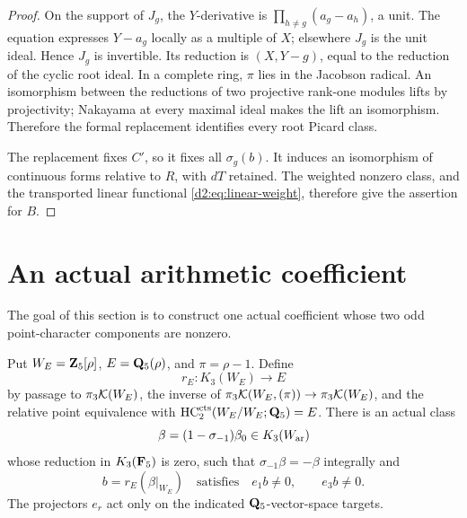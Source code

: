 \begin{proof}
On the support of \(J_g\), the \(Y\)-derivative is
\(\prod_{h\ne g}(a_g-a_h)\), a unit.
The equation expresses \(Y-a_g\) locally as a multiple of \(X\);
elsewhere \(J_g\) is the unit ideal.
Hence \(J_g\) is invertible.
Its reduction is \((X,Y-g)\), equal to the reduction of the cyclic
root ideal.
In a complete ring, \(\pi\) lies in the Jacobson radical.
An isomorphism between the reductions of two projective rank-one
modules lifts by projectivity; Nakayama at every maximal ideal
makes the lift an isomorphism.
Therefore the formal replacement identifies every root Picard class.

The replacement fixes \(C'\), so it fixes all \(\sigma_g(b)\).
It induces an isomorphism of continuous forms relative to \(R\),
with \(dT\) retained.
The weighted nonzero class, and the transported linear functional
\eqref{d2:eq:linear-weight}, therefore give the assertion for \(B\).
\end{proof}

\section{An actual arithmetic coefficient}\label{d2:sec:arithmetic}

The goal of this section is to construct one actual coefficient whose
two odd point-character components are nonzero.

\begin{proposition}\label{d2:prop:coefficient}
Put \(W_E=\mathbf{Z}_5[\rho]\), \(E=\mathbf{Q}_5(\rho)\), and
\(\pi=\rho-1\).
Define
\[
 r_E\colon K_3(W_E)\longrightarrow E
\]
by passage to \(\pi_3\mathcal K(W_E)\), the inverse of
\(\pi_3\mathcal K(W_E,(\pi))\to\pi_3\mathcal K(W_E)\), and the relative point
equivalence with \(\operatorname{HC}_2^{\mathrm{cts}}(W_E/W_E;\mathbf{Q}_5)=E\).
There is an actual class
\[
 \beta=(1-\sigma_{-1})\beta_0\in K_3(W_{\mathrm{ar}})
\]
whose reduction in \(K_3(\mathbf{F}_5)\) is zero, such that
\(\sigma_{-1}\beta=-\beta\) integrally and
\[
 b=r_E(\beta|_{W_E})
 \quad\text{satisfies}\quad e_1b\ne0,\qquad e_3b\ne0.
\]
The projectors \(e_r\) act only on the indicated
\(\mathbf{Q}_5\)-vector-space targets.
\end{proposition}

